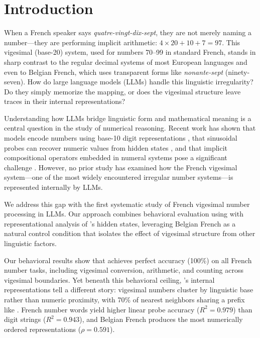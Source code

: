 \section{Introduction}
\label{sec:intro}

When a French speaker says \emph{quatre-vingt-dix-sept}, they are not merely naming a number---they are performing implicit arithmetic: $4 \times 20 + 10 + 7 = 97$.
This vigesimal (base-20) system, used for numbers 70--99 in standard French, stands in sharp contrast to the regular decimal systems of most European languages and even to Belgian French, which uses transparent forms like \emph{nonante-sept} (ninety-seven).
How do large language models (LLMs) handle this linguistic irregularity?
Do they simply memorize the mapping, or does the vigesimal structure leave traces in their internal representations?

Understanding how LLMs bridge linguistic form and mathematical meaning is a central question in the study of numerical reasoning.
Recent work has shown that models encode numbers using base-10 digit representations \citep{levy2024language}, that sinusoidal probes can recover numeric values from hidden states \citep{kadlcik2025pretrained, stefanik2025unravelling}, and that implicit compositional operators embedded in numeral systems pose a significant challenge \citep{bhattacharya2025investigating}.
However, no prior study has examined how the French vigesimal system---one of the most widely encountered irregular number systems---is represented internally by LLMs.

We address this gap with the first systematic study of French vigesimal number processing in LLMs.
Our approach combines behavioral evaluation using \gptmodel with representational analysis of \mistral's hidden states, leveraging Belgian French as a natural control condition that isolates the effect of vigesimal structure from other linguistic factors.

Our behavioral results show that \gptmodel achieves perfect accuracy (100\%) on all French number tasks, including vigesimal conversion, arithmetic, and counting across vigesimal boundaries.
Yet beneath this behavioral ceiling, \mistral's internal representations tell a different story: vigesimal numbers cluster by linguistic base rather than numeric proximity, with 70\% of nearest neighbors sharing a prefix like \quatrevingt.
French number words yield higher linear probe accuracy ($R^2 = 0.979$) than digit strings ($R^2 = 0.943$), and Belgian French produces the most numerically ordered representations ($\rho = 0.591$).

